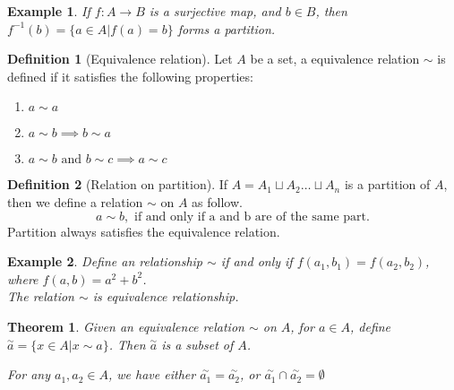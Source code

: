 \documentclass{article}
\theoremstyle{MyNonumberplain}
\theoremstyle{break}
\theoremstyle{break}
\newtheorem{theorem}{Theorem}[section]
\newtheorem{example}{Example}[section]
\theoremstyle{break}
\theoremstyle{definition}
\theoremstyle{break}
\newtheorem{definition}{Definition}[section]
\begin{document}
\begin{expbox}
    \begin{example}
        If $f : A \to B$ is a surjective map, and $b \in B$, then $f^{- 1} (b) = \{ a \in A|f (a) = b \}$ forms a partition.
    \end{example}
\end{expbox}

\begin{defbox}
    \begin{definition}[Equivalence relation]
        Let $A$ be a set, a equivalence relation $\sim$ is defined if it satisfies the following properties:
        \begin{enumerate}
            \item $a \sim a$ 
            \item $a \sim b \implies b \sim a$
            \item $a \sim b \text{ and } b \sim c \implies a \sim c$
        \end{enumerate}
    \end{definition}
\end{defbox}

\begin{defbox}
    \begin{definition}[Relation on partition]
        If $A = A_1 \sqcup A_2 \ldots \sqcup A_n$ is a partition of $A$, then we define a
        relation $\sim$ on $A$ as follow.
        \[ a \sim b, \text{ if and only if a and b are of the same part.} \]
        Partition always satisfies the equivalence relation.
    \end{definition}
\end{defbox}

\begin{expbox}
    \begin{example}
        Define an relationship $\sim$ if and only if $f (a_1, b_1) = f (a_2, b_2)$, where $f (a, b) = a^2 + b^2$.\\ The relation $\sim$ is equivalence relationship.
    \end{example}
\end{expbox}

\begin{thmbox}
    \begin{theorem}
        Given an equivalence relation $\sim$ on $A$, for $a \in A$, define
$\overset{\sim}{a} \overset{}{} = \{ x \in A|x \sim a \}$. Then
$\overset{\sim}{a}$ is a subset of $A$.

For any $a_1, a_2 \in A$, we have either $\overset{\sim}{a_1} = \overset{\sim}{a_2}$,
or $\overset{\sim}{a_1} \cap \overset{\sim}{a_2} = \emptyset$
    \end{theorem}
\end{thmbox}
\end{document}
